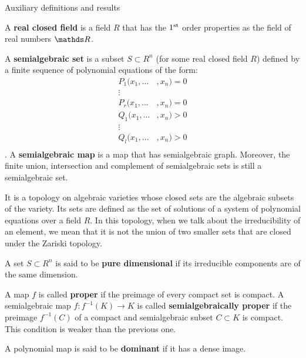\documentclass[11pt, a4paper, english, twoside, notitlepage]{report}
\begin{document}
\appendix
\begin{chapter}{Auxiliary definitions and results}

\begin{definition}\label{realCField}
A \textbf{real closed field} is a field $R$ that has the $1\textsuperscript{st}$ order properties as the field of real numbers $\R$.
\end{definition}

\begin{definition}\label{semialgSet}
A \textbf{semialgebraic set} is a subset $S \subset R^n$ (for some real closed field $R$) defined by a finite sequence of polynomial equations of the form:
\begin{align*}
	P_1(x_1, \dots&, x_n) = 0\\
	\vdots &\\
	P_r(x_1, \dots&, x_n) = 0 \\
	Q_1(x_1, \dots&, x_n) > 0 \\
	\vdots &\\
	Q_l(x_1, \dots&, x_n) > 0 \\
\end{align*}
. A \textbf{semialgebraic map} is a map that has semialgebraic graph. Moreover, the finite union, intersection and complement of semialgebraic sets is still a semialgebraic set.
\end{definition}

\begin{definition}\label{zariski}
It is a topology on algebraic varieties whose closed sets are the algebraic subsets of the variety. Its sets are defined as the set of solutions of a system of polynomial equations over a field $R$. In this topology, when we talk about the irreducibility of an element, we mean that it is not the union of two smaller sets that are closed under the Zariski topology.
\end{definition}

\begin{definition}\label{pureDim}
A set $S \subset R^n$ is said to be \textbf{pure dimensional} if its irreducible components are of the same dimension.
\end{definition}

\begin{definition}\label{properMap}
A map $f$ is called \textbf{proper} if the preimage of every compact set is compact. A semialgebraic map $f: f^{-1}(K) \longrightarrow K$ is called \textbf{semialgebraically proper} if the preimage $f^{-1}(C)$ of a compact and semialgebraic subset $C \subset K$ is compact. This condition is weaker than the previous one.
\end{definition}

\begin{definition}\label{dominant}
A polynomial map is said to be \textbf{dominant} if it has a dense image. 
\end{definition}


\end{chapter}


\begin{thebibliography}{10}


\end{thebibliography}
\end{document}
